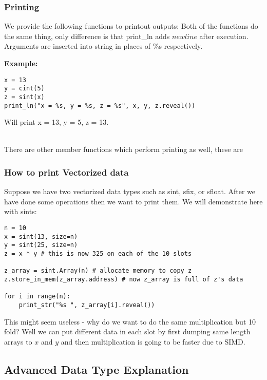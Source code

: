 \subsubsection{Printing}
We provide the following functions to printout outputs:
Both of the functions do the same thing, only difference is that print_ln adds $newline$ after execution. Arguments are inserted into string in places of $\%$s respectively. 

\noindent
\textbf{Example:}
\begin{lstlisting}
x = 13
y = cint(5)
z = sint(x)
print_ln("x = %s, y = %s, z = %s", x, y, z.reveal())
\end{lstlisting}
Will print x = 13, y = 5, z = 13.

~\\

\noindent
There are other member functions which perform printing as well, these are


\subsubsection{How to print Vectorized data}
Suppose we have two vectorized data types such as sint, sfix, or sfloat. After we have done some operations then we want to print them. We will demonstrate here with sints:

\begin{lstlisting}
n = 10
x = sint(13, size=n)
y = sint(25, size=n)
z = x * y # this is now 325 on each of the 10 slots

z_array = sint.Array(n) # allocate memory to copy z
z.store_in_mem(z_array.address) # now z_array is full of z's data

for i in range(n):
	print_str("%s ", z_array[i].reveal())
\end{lstlisting}
This might seem useless - why do we want to do the same multiplication but 10 fold? Well we can put different data in each slot by first dumping same length arrays to $x$ and $y$ and then multiplication is going to be faster due to SIMD.

\subsection{Advanced Data Type Explanation}
		
